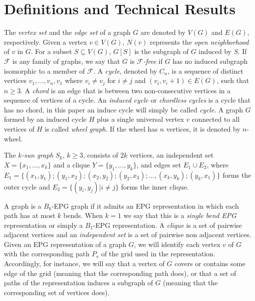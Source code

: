 \documentclass[9pt]{entcs}
\newcommand{\tanilson}[1]{\textcolor{auburn}{\sf{#1}}}%
\begin{document}
\section{Definitions and Technical Results}


The \textit{vertex set} and the \textit{edge set} of a graph $G$ are denoted by $V(G)$ and $E(G)$, respectively.  Given a vertex $v\in V(G)$,  $N(v)$  represents the \textit{open
 neighborhood} of $v$ in $G$. 
For a subset $S \subseteq V(G)$,  $G[S]$ is the subgraph of $G$ induced by $S$.
 If $\mathcal{F}$ is any family of graphs, we say that  $G$ is  \textit{$\mathcal{F}$-free} if $G$ has no induced subgraph isomorphic to a member of $\mathcal{F}$.
 A \textit{cycle},  denoted by $C_n$,  is a sequence of distinct
vertices $v_1, \dots , v_n, v_1$  where $v_i \neq v_j$ for $i \neq j$ and $(v_i, v_i + 1) \in E(G)$, such that
$n \geq 3$. A \textit{chord} is an edge that is between two non-consecutive vertices in a sequence of vertices of a cycle. An \textit{induced cycle}  or \textit{chordless cycles} is a cycle that has no chord, in this paper an induce cycle will simply be called  \textit{cycle}. A graph $G$ formed by an induced cycle $H$ plus  a single universal vertex $v$ connected to all vertices of $H$
is called \textit{wheel graph}. If the wheel has $n$ vertices, it is denoted by $n$-wheel. 

The $k$\textit{-sun graph }$S_k$, $k \geq 3$, consists of
$2k$ vertices, an independent set $X = \{x_1, \dots, x_k\}$ and a clique $Y = \{y_1, \dots, y_k\}$, and edges set $E_1 \cup E_2$, where $E_ 1=\{ (x_1,y_1); (y_1, x_2); (x_2, y_2); (y_2, x_3); \dots , (x_k, y_k); (y_k, x_1) \}$ forms the outer cycle and $E_2= \{(y_i, y_j) |i\neq j\}$ forms the inner clique.

A graph is a $ B_k$-EPG graph if it admits an EPG representation in which each path has at most $k$ bends.  When $ k = 1 $ we say that this is a \emph{single bend EPG} representation or simply a $B_1$-EPG representation.
A \textit{clique} is a set of pairwise adjacent vertices and
an \textit{independent set} is a set of pairwise non adjacent vertices.
Given an EPG representation of a graph $G$, we will identify each vertex $v$ of $G$ with the corresponding path $P_{v}$ of the grid used in the representation. Accordingly, for instance, we will say that a vertex of $G$ covers or contains some edge of the grid (meaning that the corresponding path does), or that a set of paths of the representation
induces a subgraph of $G$ (meaning that the corresponding set of vertices does). 
\end{document}

